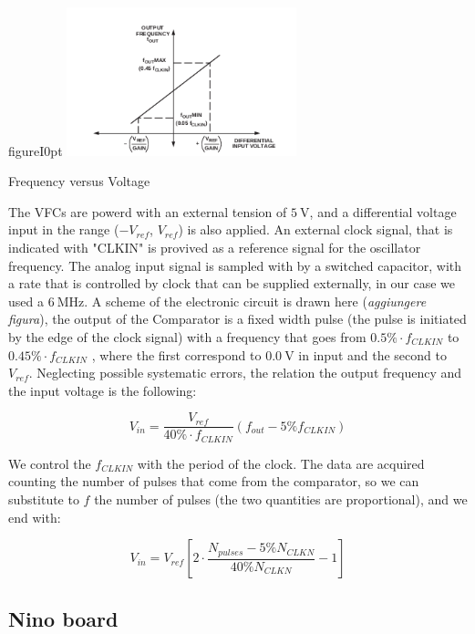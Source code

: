 \begin{wrapfloat}{figure}{I}{0pt}
\includegraphics[width=0.5\textwidth]{ExperimentalSetup/Vfc.png}
\caption{Frequency versus Voltage}
\end{wrapfloat}

The VFCs are powerd with an external tension of $\SI{5}{\volt}$, and a differential voltage input in the range ($-V_{ref}$, $V_{ref}$) is also applied. An external clock signal, that is indicated with "CLKIN" is provived as a reference signal for the oscillator frequency.
The analog input signal is sampled with by a switched capacitor, with a rate that is controlled by clock  that can be supplied externally, in our case we used a $\SI{6}{\mega \hertz}$. A scheme of the electronic circuit is drawn here (\textit{aggiungere figura}), the output of the Comparator  is a fixed width pulse (the pulse is initiated by the edge of the clock signal) with a frequency that goes from $0.5 \% \cdot f_{CLKIN}$ to $0.45 \% \cdot f_{CLKIN}$ \cite{VfcDatasheet}, where the first correspond to $\SI{0.0}{ \volt}$ in input and the second to $V_{ref}$. Neglecting possible systematic errors, the relation the output frequency and the input voltage is the following:

\begin{equation}
V_{in} = \frac{V_{ref}}{40 \% \cdot f_{CLKIN}} (f_{out} - 5\% f_{CLKIN})
\end{equation}

We control the $f_{CLKIN}$ with the period of the clock. The data are acquired counting the number of pulses that come from the comparator, so we can substitute to $f$ the number of pulses (the two quantities are proportional), and we end with:

\begin{equation}
V_{in} =  V_{ref}[2 \cdot \dfrac{N_{pulses} - 5 \% N_{CLKN}}{40 \% N_{CLKN}} - 1]
\end{equation}

\subsection{Nino board} \label{NINO}

